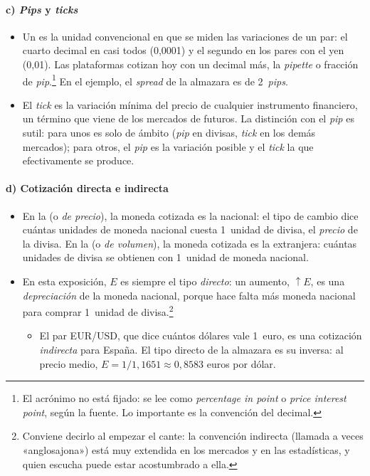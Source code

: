 \documentclass[11pt]{article}
\begin{document}
\paragraph{c) \emph{Pips} y \emph{ticks}}

\begin{itemize}
\item Un  es la unidad convencional en que se miden las variaciones de un par: el cuarto decimal en casi todos (0,0001) y el segundo en los pares con el yen (0,01). Las plataformas cotizan hoy con un decimal más, la \emph{pipette} o fracción de \emph{pip}.\footnote{El acrónimo no está fijado: se lee como \emph{percentage in point} o \emph{price interest point}, según la fuente. Lo importante es la convención del decimal.} En el ejemplo, el \emph{spread} de la almazara es de 2~\emph{pips}.
\item El \emph{tick} es la variación mínima del precio de cualquier instrumento financiero, un término que viene de los mercados de futuros. La distinción con el \emph{pip} es sutil: para unos es solo de ámbito (\emph{pip} en divisas, \emph{tick} en los demás mercados); para otros, el \emph{pip} es la variación posible y el \emph{tick} la que efectivamente se produce.
\end{itemize}

\paragraph{d) Cotización directa e indirecta}

\begin{itemize}
\item En la  (o \emph{de precio}), la moneda cotizada es la nacional: el tipo de cambio dice cuántas unidades de moneda nacional cuesta 1~unidad de divisa, el \emph{precio} de la divisa. En la  (o \emph{de volumen}), la moneda cotizada es la extranjera: cuántas unidades de divisa se obtienen con 1~unidad de moneda nacional.
\item En esta exposición, $E$ es siempre el tipo \emph{directo}: un aumento, $\uparrow E$, es una \emph{depreciación} de la moneda nacional, porque hace falta más moneda nacional para comprar 1~unidad de divisa.\footnote{Conviene decirlo al empezar el cante: la convención indirecta (llamada a veces «anglosajona») está muy extendida en los mercados y en las estadísticas, y quien escucha puede estar acostumbrado a ella.}
  \begin{itemize}
  \item El par EUR/USD, que dice cuántos dólares vale 1~euro, es una cotización \emph{indirecta} para España. El tipo directo de la almazara es su inversa: al precio medio, $E=1/1{,}1651\approx0{,}8583$ euros por dólar.
  \end{itemize}
\end{itemize}
\end{document}
